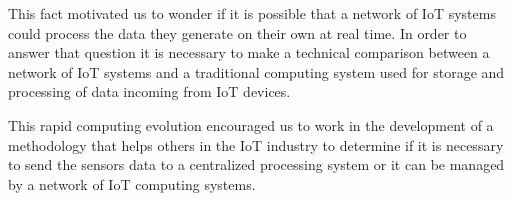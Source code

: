 This fact motivated us to wonder if it is possible that a network of IoT
systems could process the data they generate on their own at real time. In
order to answer that question it is necessary to make a technical comparison
between a network of IoT systems and a traditional computing system used for
storage and processing of data incoming from IoT devices. 

This rapid computing evolution encouraged us to work in the development of a
methodology that helps others in the IoT industry to determine if it is
necessary to send the sensors data to a centralized processing system or it can
be managed by a network of IoT computing systems. 

\clearpage
